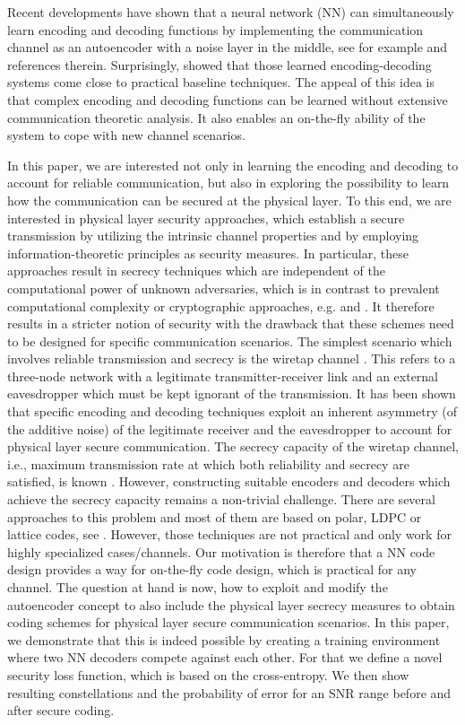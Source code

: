 \documentclass[conference]{IEEEtran}
\begin{document}
Recent developments have shown that a neural network (NN) can simultaneously learn encoding and decoding functions by implementing the communication channel as an autoencoder with a noise layer in the middle, see for example \cite{OShea2017} and references therein. Surprisingly, \cite{SBrink2018} showed that those learned encoding-decoding systems come close to practical baseline techniques. The appeal of this idea is that complex encoding and decoding functions can be learned without extensive communication theoretic analysis. It also enables an on-the-fly ability of the system to cope with new channel scenarios. 

In this paper, we are interested not only in learning the encoding and decoding to account for reliable communication, but also in exploring the possibility to learn how the communication can be secured at the physical layer. To this end, we are interested in physical layer security approaches, which establish a secure transmission by utilizing the intrinsic channel properties and by employing information-theoretic principles as security measures. In particular, these approaches result in secrecy techniques which are independent of the computational power of unknown adversaries, which is in contrast to prevalent computational complexity or cryptographic approaches, e.g. \cite{diffie1976new} and \cite{Rivest:1978}. It therefore results in a stricter notion of security with the drawback that these schemes need to be designed for specific communication scenarios. The simplest scenario which involves reliable transmission and secrecy is the wiretap channel \cite{Wyner75}. This refers to a three-node network with a legitimate transmitter-receiver link and an external eavesdropper which must be kept ignorant of the transmission. It has been shown that specific encoding and decoding techniques exploit an inherent asymmetry (of the additive noise) of the legitimate receiver and the eavesdropper to account for physical layer secure communication. The secrecy capacity of the wiretap channel, i.e., maximum transmission rate at which both reliability and secrecy are satisfied, is known \cite{BlochBarros-2011-PhysicalLayerSecurity,PoorSchaefer-2017-WirelessPhysicalLayerSecurity}. However, constructing suitable encoders and decoders which achieve the secrecy capacity remains a non-trivial challenge. There are several approaches to this problem and most of them are based on polar, LDPC or lattice codes, see \cite{Wu_InfoSecCodingOverview}. However, those techniques are not practical and only work for highly specialized cases/channels. Our motivation is therefore that a NN code design provides a way for on-the-fly code design, which is practical for any channel. The question at hand is now, how to exploit and modify the autoencoder concept to also include the physical layer secrecy measures to obtain coding schemes for physical layer secure communication scenarios. In this paper, we demonstrate that this is indeed possible by creating a training environment where two NN decoders compete against each other. For that we define a novel security loss function, which is based on the cross-entropy. We then show resulting constellations and the probability of error for an SNR range before and after secure coding.
\end{document}
